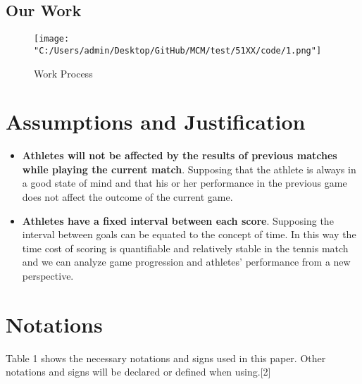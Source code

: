 \documentclass{mcmthesis}
\begin{document}
\subsection{Our Work}

\begin{figure}[h]   
\centering          
\texttt{[image: "C:/Users/admin/Desktop/GitHub/MCM/test/51XX/code/1.png"]}
\caption{Work Process} \label{fig1}    
\end{figure}

\section{Assumptions and Justification}
\begin{itemize}
\item {\bf Athletes will not be affected by the results of previous matches while playing the
current match}. Supposing that the athlete is always in a good state of mind and that his or her
performance in the previous game does not affect the outcome of the current game.
        
\item {\bf Athletes have a fixed interval between each score}. Supposing the interval between goals
can be equated to the concept of time. In this way the time cost of scoring is quantifiable and
relatively stable in the tennis match and we can analyze game progression and athletes’ performance from a new perspective.

\end{itemize}

\section{Notations}

\setlength{\parindent}{2em} 
Table 1 shows the necessary notations and signs used in this paper. Other notations and signs
will be declared or defined when using.[2]

\newpage
\end{document}
